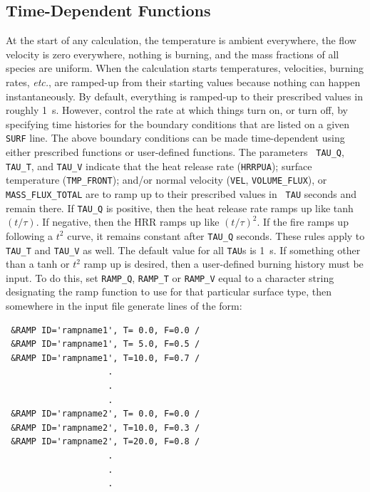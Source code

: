 \documentclass[11pt]{book}
\newcommand{\ct}{\tt\small}
\begin{document}
\subsection{Time-Dependent Functions}

At the start of any calculation, the temperature is ambient
everywhere, the flow velocity is zero everywhere, nothing is burning,
and the mass fractions of all species are uniform.  When the
calculation starts temperatures, velocities, burning rates, {\em
etc.}, are ramped-up from their starting values because nothing can
happen instantaneously. By default, everything is ramped-up to their
prescribed values in roughly 1~s. However, control the rate at which
things turn on, or turn off, by specifying time histories for the
boundary conditions that are listed on a given {\ct SURF} line.  The
above boundary conditions can be made time-dependent using either
prescribed functions or user-defined functions.  The parameters {\ct
TAU\_Q}, {\ct TAU\_T}, and {\ct TAU\_V} indicate that the heat release
rate ({\ct HRRPUA}); surface temperature ({\ct TMP\_FRONT}); and/or
normal velocity ({\ct VEL}, {\ct VOLUME\_FLUX}), or {\ct
MASS\_FLUX\_TOTAL} are to ramp up to their prescribed values in {\ct
TAU} seconds and remain there.  If {\ct TAU\_Q} is positive, then the
heat release rate ramps up like tanh$(t/\tau)$. If negative, then the
HRR ramps up like $(t/\tau)^2$. If the fire ramps up following a $t^2$
curve, it remains constant after {\ct TAU\_Q} seconds.  These rules
apply to {\ct TAU\_T} and {\ct TAU\_V} as well.  The default value for
all {\ct TAU}s is 1~s.  If something other than a tanh or $t^2$ ramp
up is desired, then a user-defined burning history must be input. To
do this, set {\ct RAMP\_Q}, {\ct RAMP\_T} or {\ct RAMP\_V} equal to a
character string designating the ramp function to use for that
particular surface type, then somewhere in the input file generate
lines of the form:

\footnotesize
\begin{verbatim}
 &RAMP ID='rampname1', T= 0.0, F=0.0 /
 &RAMP ID='rampname1', T= 5.0, F=0.5 /
 &RAMP ID='rampname1', T=10.0, F=0.7 /
                    .
                    .
                    .
 &RAMP ID='rampname2', T= 0.0, F=0.0 /
 &RAMP ID='rampname2', T=10.0, F=0.3 /
 &RAMP ID='rampname2', T=20.0, F=0.8 /
                    .
                    .
                    .
\end{verbatim}
\normalsize

\noindent
\end{document}
